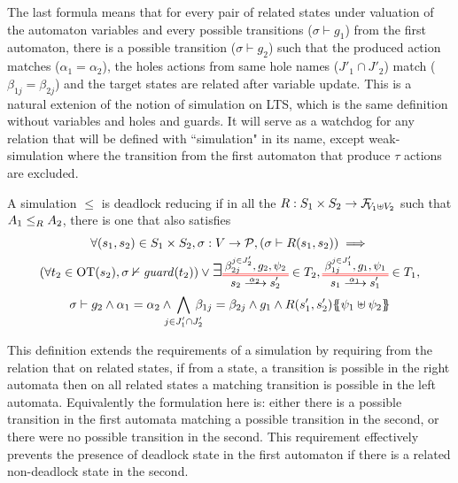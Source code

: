 \documentclass{article}
\begin{document}
The last formula means that for every pair of related states under valuation of the automaton variables and every possible transitions (\(\sigma \vdash g_1\)) from the first automaton, there is a possible transition (\(\sigma \vdash g_2\)) such that the produced action matches (\(\alpha_1 = \alpha_2\)), the holes actions from same hole names (\(J'_1 \cap J'_2\)) match (\(\beta_{1j} = \beta_{2j}\)) and the target states are related after variable update.
This is a natural extenion of the notion of simulation on LTS, which is the same definition without variables and holes and guards.
It will serve as a watchdog for any relation that will be defined with ``simulation" in its name, except weak-simulation where the transition from the first automaton that produce \(\tau\) actions are excluded.

\begin{defi}
A simulation \(\leq\) is deadlock reducing if in all the \(R: S_1 \times S_2 \to \rformulae[V_1 \uplus V_2]\) such that \(\wrel{A_1}{A_2}{R}\), there is one that also satisfies
\begin{multline*}
	\forall \mpar{s_1, s_2} \in S_1 \times S_2, \sigma: V \to \values, \mpar{\sigma \vdash R\mpar{s_1, s_2}} \implies \\
	\mpar{\forall t_2 \in \fOT{s_2}, \sigma \nvdash \fguard{t_2}} \vee \bigsymb{\exists} \OTx{2}{}{2}{2} \in T_2, \OTx{1}{}{1}{1} \in T_1, \\
	\sigma \vdash g_2 \wedge \alpha_1 = \alpha_2 \wedge \bigwedge_\subbox{j \in J'_1 \cap J'_2} \beta_{1j} = \beta_{2j} \wedge g_1 \wedge R\mpar{s'_1, s'_2}\psubst{\psi_1 \uplus \psi_2}
\end{multline*}
\end{defi}
This definition extends the requirements of a simulation by requiring from the relation that on related states, if from a state, a transition is possible in the right automata then on all related states a matching transition is possible in the left automata.
Equivalently the formulation here is: either there is a possible transition in the first automata matching a possible transition in the second, or there were no possible transition in the second.
This requirement effectively prevents the presence of deadlock state in the first automaton if there is a related non-deadlock state in the second.

\end{document}
